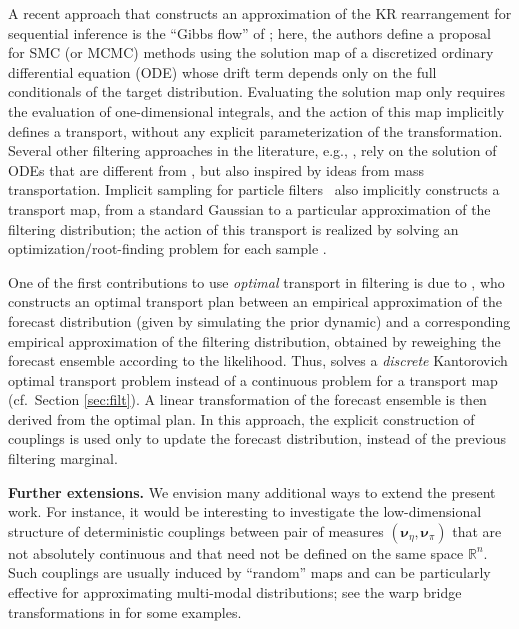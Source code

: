 \documentclass[twoside,11pt]{article}
\newcommand{\genm}{\boldsymbol{\nu} }   %
\newcommand{\re}{\mathbb{R}}
\begin{document}
%
A recent approach that constructs an approximation of the KR rearrangement 
%
%
for sequential inference is the ``Gibbs flow'' of
\citet{heng2015gibbs}; here, the authors define a proposal for SMC (or
MCMC) methods using the solution map of a discretized ordinary
differential equation (ODE) whose drift term depends only on the full
conditionals of the target distribution.
%
Evaluating the solution map only requires the evaluation of
one-dimensional integrals, and the action of this map implicitly
defines a transport, without any explicit parameterization of the
transformation. 
%
%
%
%
%
%
%
%
%
Several other filtering approaches in the literature, e.g., \citep{daum2012particle,yang2013feedback}, rely on the solution of ODEs that are different from \citet{heng2015gibbs}, but also inspired by ideas from mass transportation.
%
Implicit sampling for particle filters~\citep{chorin2009implicit} also implicitly constructs a transport map, from a standard Gaussian to a particular approximation of the filtering distribution; the action of this transport is realized by solving an optimization/root-finding problem for each sample \citep{Morzfeld2012}. 
%

%
%
%
%
One of the first %
contributions
to use \textit{optimal} transport in
filtering is due to \citet{reich2013nonparametric}, who constructs an
optimal transport {plan} between an empirical approximation of the
forecast distribution (given by simulating the prior dynamic) and a
corresponding empirical approximation of the filtering distribution,
obtained by reweighing the forecast ensemble according to the
likelihood.  Thus, \citet{reich2013nonparametric} solves a {\it
  discrete} Kantorovich optimal transport
problem %
instead of a continuous problem for a transport map (cf.\ Section
\ref{sec:filt}). A linear transformation of the forecast ensemble
is then derived from the optimal plan. In this approach, the explicit
construction of couplings is used only to update the forecast
distribution, instead of the previous filtering
marginal. %

%
%
%
%
%
%
%
%
%
%
%
%
%
%
%
%
%
%
%
%
 
%
%
%
%
%
%
%
%
%
%
%
%
%
%
%
%
%
%
%
%
%
%
%
%
%
%
%
%
%
%
%
%
%
%
%
%
%


%
{\bf Further extensions.}
%
We envision many additional ways to extend the present work.
%
For instance, it would be interesting to investigate the low-dimensional
structure of deterministic couplings between pair of measures
$(\genm_\eta,\genm_\pi)$ that 
are not absolutely continuous and that need not be
defined
on the same  space $\re^n$.
Such couplings are usually induced by ``random'' maps and
can be particularly effective for approximating
multi-modal distributions; see the warp bridge transformations in
\citep{meng2002warp,wang2016warp} for some examples.
%
%
\end{document}
